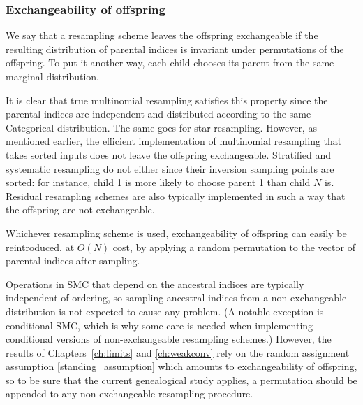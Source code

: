 %




\subsubsection{Exchangeability of offspring}
We say that a resampling scheme leaves the offspring exchangeable if the resulting distribution of parental indices is invariant under permutations of the offspring. To put it another way, each child chooses its parent from the same marginal distribution.

It is clear that true multinomial resampling satisfies this property since the parental indices are independent and distributed according to the same Categorical distribution. 
The same goes for star resampling. 
However, as mentioned earlier, the efficient implementation of multinomial resampling that takes sorted inputs does not leave the offspring exchangeable.
Stratified and systematic resampling do not either since their inversion sampling points are sorted: for instance, child 1 is more likely to choose parent 1 than child $N$ is.
Residual resampling schemes are also typically implemented in such a way that the offspring are not exchangeable.

Whichever resampling scheme is used, exchangeability of offspring can easily be reintroduced, at $O(N)$ cost, by applying a random permutation to the vector of parental indices after sampling.

Operations in SMC that depend on the ancestral indices are typically independent of ordering, so sampling ancestral indices from a non-exchangeable distribution is not expected to cause any problem. (A notable exception is conditional SMC, which is why some care is needed when implementing conditional versions of non-exchangeable resampling schemes.)
However, the results of Chapters~\ref{ch:limits} and \ref{ch:weakconv} rely on the random assignment assumption \ref{standing_assumption} which amounts to exchangeability of offspring, so to be sure that the current genealogical study applies, a permutation should be appended to any non-exchangeable resampling procedure.






